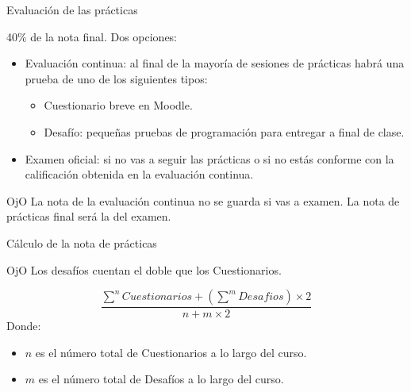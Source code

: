 \documentclass[usenames,dvipsnames,aspectratio=169]{beamer}
\begin{document}
\begin{frame}{Evaluación de las prácticas}
\begin{minipage}{.65\linewidth}
    40\% de la nota final.
    Dos opciones:
    \begin{itemize}
        \item Evaluación continua: al final de la mayoría de sesiones de prácticas habrá una prueba de uno de los siguientes tipos:
        \begin{itemize}
            \item Cuestionario breve en Moodle.
            \item Desafío: pequeñas pruebas de programación para entregar a final de clase.
        \end{itemize}
        \item Examen oficial: si no vas a seguir las prácticas o si no estás conforme con la calificación obtenida en la evaluación continua.
    \end{itemize}
\end{minipage}
\hspace{0.5cm}
\begin{minipage}{.3\linewidth}
    \begin{block}{OjO}
        La nota de la evaluación continua no se guarda si vas a examen. La nota de prácticas final será la del examen.
    \end{block}
\end{minipage}
\end{frame}

\begin{frame}{Cálculo de la nota de prácticas}
    \begin{block}{OjO}
    Los desafíos cuentan el doble que los Cuestionarios.
    \end{block}
    \begin{equation*}
        \frac{\sum^n Cuestionarios + (\sum^m Desafios)\times 2}{n + m\times2}
    \end{equation*}
    Donde:
    \begin{itemize}
        \item $n$ es el número total de Cuestionarios a lo largo del curso.
        \item $m$ es el número total de Desafíos a lo largo del curso.
    \end{itemize}
\end{frame}
\end{document}
